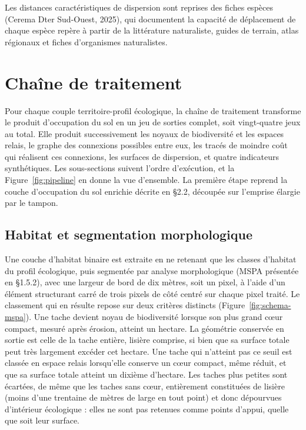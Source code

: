 \documentclass[a4paper,12pt]{report}
\begin{document}
Les distances caractéristiques de dispersion sont reprises des fiches espèces (Cerema Dter Sud-Ouest, 2025), qui documentent la capacité de déplacement de chaque espèce repère à partir de la littérature naturaliste, guides de terrain, atlas régionaux et fiches d'organismes naturalistes.

\section{Chaîne de traitement}
Pour chaque couple territoire-profil écologique, la chaîne de traitement transforme le produit d'occupation du sol en un jeu de sorties complet, soit vingt-quatre jeux au total. Elle produit successivement les noyaux de biodiversité et les espaces relais, le graphe des connexions possibles entre eux, les tracés de moindre coût qui réalisent ces connexions, les surfaces de dispersion, et quatre indicateurs synthétiques. Les sous-sections suivent l'ordre d'exécution, et la Figure~\ref{fig:pipeline} en donne la vue d'ensemble. La première étape reprend la couche d'occupation du sol enrichie décrite en §2.2, découpée sur l'emprise élargie par le tampon.

\subsection{Habitat et segmentation morphologique}
Une couche d'habitat binaire est extraite en ne retenant que les classes d'habitat du profil écologique, puis segmentée par analyse morphologique (MSPA présentée en §1.5.2), avec une largeur de bord de dix mètres, soit un pixel, à l'aide d'un élément structurant carré de trois pixels de côté centré sur chaque pixel traité. Le classement qui en résulte repose sur deux critères distincts (Figure~\ref{fig:schema-mspa}). Une tache devient noyau de biodiversité lorsque son plus grand cœur compact, mesuré après érosion, atteint un hectare. La géométrie conservée en sortie est celle de la tache entière, lisière comprise, si bien que sa surface totale peut très largement excéder cet hectare. Une tache qui n'atteint pas ce seuil est classée en espace relais lorsqu'elle conserve un cœur compact, même réduit, et que sa surface totale atteint un dixième d'hectare. Les taches plus petites sont écartées, de même que les taches sans cœur, entièrement constituées de lisière (moins d'une trentaine de mètres de large en tout point) et donc dépourvues d'intérieur écologique : elles ne sont pas retenues comme points d'appui, quelle que soit leur surface.
\end{document}
